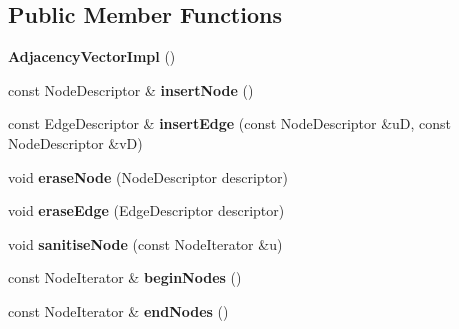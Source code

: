 \subsection*{Public Member Functions}
\begin{DoxyCompactItemize}
\item 
\hypertarget{class_packed_adjacency_vector_impl_a6ebc3b1dca713ad5e38dabe15aedc3d8}{
{\bfseries AdjacencyVectorImpl} ()}
\label{class_packed_adjacency_vector_impl_a6ebc3b1dca713ad5e38dabe15aedc3d8}

\item 
\hypertarget{class_packed_adjacency_vector_impl_aec2489b5086032a36cdeec01568383be}{
const NodeDescriptor \& {\bfseries insertNode} ()}
\label{class_packed_adjacency_vector_impl_aec2489b5086032a36cdeec01568383be}

\item 
\hypertarget{class_packed_adjacency_vector_impl_aa3274efd1814c0ec47285ab525badde0}{
const EdgeDescriptor \& {\bfseries insertEdge} (const NodeDescriptor \&uD, const NodeDescriptor \&vD)}
\label{class_packed_adjacency_vector_impl_aa3274efd1814c0ec47285ab525badde0}

\item 
\hypertarget{class_packed_adjacency_vector_impl_ab93b0b91198d9f6209c9d66f40254878}{
void {\bfseries eraseNode} (NodeDescriptor descriptor)}
\label{class_packed_adjacency_vector_impl_ab93b0b91198d9f6209c9d66f40254878}

\item 
\hypertarget{class_packed_adjacency_vector_impl_ac3b4b93ab592ed562cb242cdaa7803c4}{
void {\bfseries eraseEdge} (EdgeDescriptor descriptor)}
\label{class_packed_adjacency_vector_impl_ac3b4b93ab592ed562cb242cdaa7803c4}

\item 
\hypertarget{class_packed_adjacency_vector_impl_aa0a17d759cfd1c2888a7f6b8c37aa23c}{
void {\bfseries sanitiseNode} (const NodeIterator \&u)}
\label{class_packed_adjacency_vector_impl_aa0a17d759cfd1c2888a7f6b8c37aa23c}

\item 
\hypertarget{class_packed_adjacency_vector_impl_ae54afed7e1d107a194399ea7419d792d}{
const NodeIterator \& {\bfseries beginNodes} ()}
\label{class_packed_adjacency_vector_impl_ae54afed7e1d107a194399ea7419d792d}

\item 
\hypertarget{class_packed_adjacency_vector_impl_a53d902f406eb55d478096970ffa2258e}{
const NodeIterator \& {\bfseries endNodes} ()}
\label{class_packed_adjacency_vector_impl_a53d902f406eb55d478096970ffa2258e}


\end{DoxyCompactItemize}
